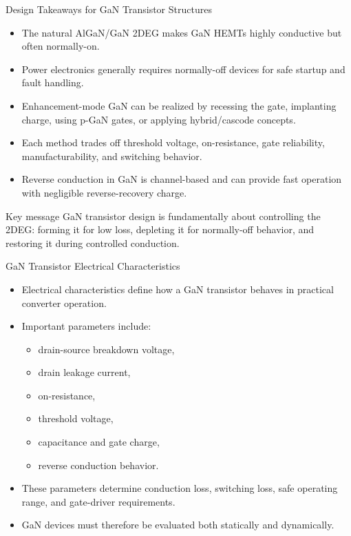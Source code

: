 \begin{frame}{Design Takeaways for GaN Transistor Structures}
\begin{itemize}
    \item The natural AlGaN/GaN 2DEG makes GaN HEMTs highly conductive but often normally-on.
    \item Power electronics generally requires normally-off devices for safe startup and fault handling.
    \item Enhancement-mode GaN can be realized by recessing the gate, implanting charge, using p-GaN gates, or applying hybrid/cascode concepts.
    \item Each method trades off threshold voltage, on-resistance, gate reliability, manufacturability, and switching behavior.
    \item Reverse conduction in GaN is channel-based and can provide fast operation with negligible reverse-recovery charge.
\end{itemize}

\begin{block}{Key message}
GaN transistor design is fundamentally about controlling the 2DEG: forming it for low loss, depleting it for normally-off behavior, and restoring it during controlled conduction.
\end{block}
\end{frame}



\begin{frame}{GaN Transistor Electrical Characteristics}

\begin{itemize}
    \item Electrical characteristics define how a GaN transistor behaves in practical converter operation.
    \item Important parameters include:
    \begin{itemize}
        \item drain-source breakdown voltage,
        \item drain leakage current,
        \item on-resistance,
        \item threshold voltage,
        \item capacitance and gate charge,
        \item reverse conduction behavior.
    \end{itemize}
    \item These parameters determine conduction loss, switching loss, safe operating range, and gate-driver requirements.
    \item GaN devices must therefore be evaluated both statically and dynamically.
\end{itemize}

\end{frame}


